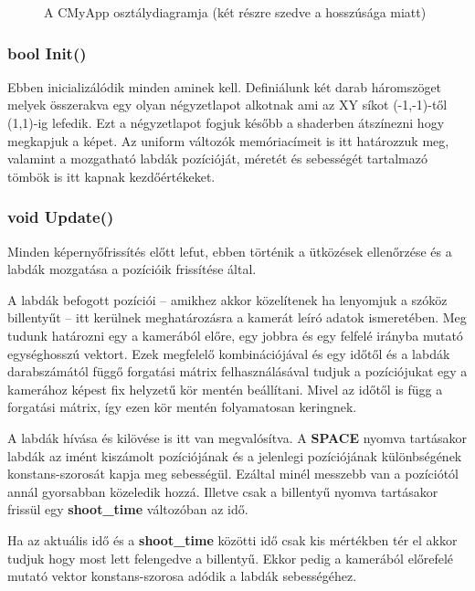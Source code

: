 \begin{figure}[H]
	\centering
	\hspace{1pt}
	\caption{A CMyApp osztálydiagramja (két részre szedve a hosszúsága miatt)}
	\label{fig:uml}
\end{figure}

\subsubsection{bool Init()}

Ebben inicializálódik minden aminek kell. Definiálunk két darab háromszöget melyek összerakva egy olyan négyzetlapot alkotnak ami az XY síkot (-1,-1)-től (1,1)-ig lefedik. Ezt a négyzetlapot fogjuk később a shaderben átszínezni hogy megkapjuk a képet. Az uniform változók memóriacímeit is itt határozzuk meg, valamint a mozgatható labdák pozícióját, méretét és sebességét tartalmazó tömbök is itt kapnak kezdőértékeket.

\subsubsection{void Update()}

Minden képernyőfrissítés előtt lefut, ebben történik a ütközések ellenőrzése és a labdák mozgatása a pozícióik frissítése által. 

A labdák befogott pozíciói -- amikhez akkor közelítenek ha lenyomjuk a szóköz billentyűt -- itt kerülnek meghatározásra a kamerát leíró adatok ismeretében. Meg tudunk határozni egy a kamerából előre, egy jobbra és egy felfelé irányba mutató egységhosszú vektort. Ezek megfelelő kombinációjával és egy időtől és a labdák darabszámától függő forgatási mátrix felhasználásával tudjuk a pozíciójukat egy a kamerához képest fix helyzetű kör mentén beállítani. Mivel az időtől is függ a forgatási mátrix, így ezen kör mentén folyamatosan keringnek.

A labdák hívása és kilövése is itt van megvalósítva. A \textbf{SPACE} nyomva tartásakor labdák az imént kiszámolt pozíciójának és a jelenlegi pozíciójának különbségének konstans-szorosát kapja meg sebességül. Ezáltal minél messzebb van a pozíciótól annál gyorsabban közeledik hozzá. Illetve csak a billentyű nyomva tartásakor frissül egy \textbf{shoot\_time} változóban az idő. 

Ha az aktuális idő és a \textbf{shoot\_time} közötti idő csak kis mértékben tér el akkor tudjuk hogy most lett felengedve a billentyű. Ekkor pedig a kamerából előrefelé mutató vektor konstans-szorosa adódik a labdák sebességéhez.

